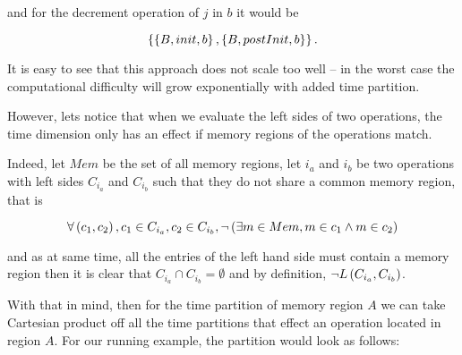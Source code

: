 \documentclass[..thesis.tex]{subfiles}
\begin{document}
and for the decrement operation of $j$ in $b$ it would be

\begin{equation*}
\left\lbrace \left\lbrace B, init, b \right\rbrace, \left\lbrace B, postInit, b \right\rbrace \right\rbrace \text{.}
\end{equation*}


It is easy to see that this approach does not scale too well -- in the worst case the computational difficulty will grow exponentially with added time partition.


However, lets notice that when we evaluate the left sides of two operations, the time dimension only has an effect if memory regions of the operations match. 

Indeed, let $Mem$ be the set of all memory regions, let $i_{a}$ and $i_{b}$ be two operations with left sides $C_{i_{a}}$ and $C_{i_{b}}$ such that they do not share a common memory region,
that is

\begin{equation*}
\forall \left( c_1, c_2 \right), c_1 \in C_{i_a} , c_2 \in C_{i_b} , \lnot \left( \exists m \in Mem,  m \in c_1 \land m \in c_2 \right)
\end{equation*} 


and as at same time, all the entries of the left hand side must contain a memory region then it is clear that $C_{i_{a}} \cap C_{i_{b}} = \emptyset$ and by definition,
$\lnot L \left( C_{i_{a}}, C_{i_{b}} \right) $. 

With that in mind, then for the time partition of memory region $A$ we can take Cartesian product off all the time partitions that effect an operation located in region $A$.
For our running example, the partition would look as follows:
\end{document}
